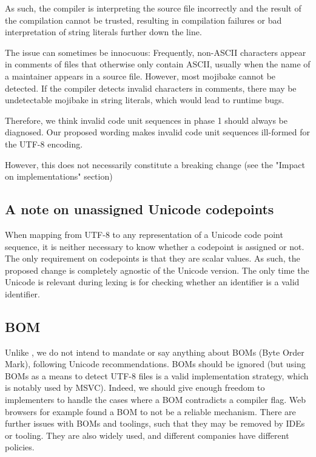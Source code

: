\documentclass{wg21}
\begin{document}
As such, the compiler is interpreting the source file incorrectly and the result of the compilation cannot be trusted,
resulting in compilation failures or bad interpretation of string literals further down the line.

The issue can sometimes be innocuous:
Frequently, non-ASCII characters appear in comments of files that otherwise only contain ASCII, usually when the name of
a maintainer appears in a source file.
However, most mojibake cannot be detected. If the compiler detects invalid characters in comments, there may be undetectable
mojibake in string literals, which would lead to runtime bugs.

Therefore, we think invalid code unit sequences in phase 1 should always be diagnosed.
Our proposed wording makes invalid code unit sequences ill-formed for the UTF-8 encoding.

However, this does not necessarily constitute a breaking change (see the "Impact on implementations" section)

\subsection{A note on unassigned Unicode codepoints}

When mapping from UTF-8 to any representation of a Unicode code point sequence, it is neither necessary to know
whether a codepoint is assigned or not.
The only requirement on codepoints is that they are scalar values.
As such, the proposed change is completely agnostic of the Unicode version.
The only time the Unicode is relevant during lexing is for checking whether an identifier is a valid identifier.

\subsection{BOM}

Unlike , we do not intend to mandate or say anything about BOMs (Byte Order Mark), following Unicode recommendations.
BOMs should be ignored (but using BOMs as a means to detect UTF-8 files is a valid implementation strategy, which is notably used by MSVC).
Indeed, we should give enough freedom to implementers to handle the cases where a BOM contradicts a compiler flag.
Web browsers for example found a BOM to not be a reliable mechanism.
There are further issues with BOMs and toolings, such that they may be removed by IDEs or tooling.
They are also widely used, and different companies have different policies.
\end{document}
